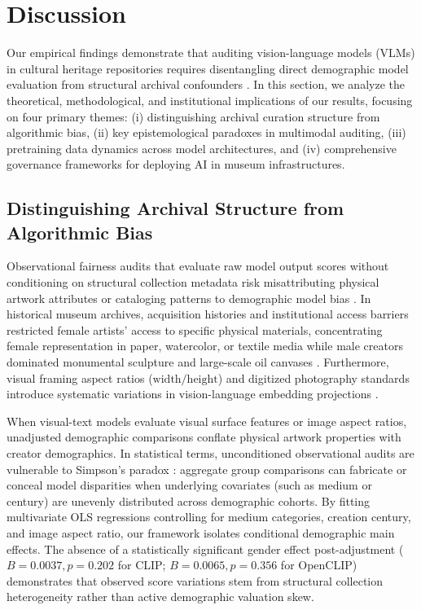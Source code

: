 \documentclass[pdflatex,sn-mathphys-num]{sn-jnl}%
\theoremstyle{thmstyleone}%
\theoremstyle{thmstyletwo}%
\theoremstyle{thmstylethree}%
\begin{document}
\section{Discussion}
\label{sec:discussion}

Our empirical findings demonstrate that auditing vision-language models (VLMs) in cultural heritage repositories requires disentangling direct demographic model evaluation from structural archival confounders \cite{hall2023auditing, noorthuis2020bias, simpson1951interpretation}. In this section, we analyze the theoretical, methodological, and institutional implications of our results, focusing on four primary themes: (i) distinguishing archival curation structure from algorithmic bias, (ii) key epistemological paradoxes in multimodal auditing, (iii) pretraining data dynamics across model architectures, and (iv) comprehensive governance frameworks for deploying AI in museum infrastructures.

\subsection{Distinguishing Archival Structure from Algorithmic Bias}
Observational fairness audits that evaluate raw model output scores without conditioning on structural collection metadata risk misattributing physical artwork attributes or cataloging patterns to demographic model bias \cite{hall2023auditing, buolamwini2018gender}. In historical museum archives, acquisition histories and institutional access barriers restricted female artists' access to specific physical materials, concentrating female representation in paper, watercolor, or textile media while male creators dominated monumental sculpture and large-scale oil canvases \cite{topaz2019diversity, bailey2020gender, nochlin1971why}. Furthermore, visual framing aspect ratios ($\text{width}/\text{height}$) and digitized photography standards introduce systematic variations in vision-language embedding projections \cite{fiorucci2020machine}.

When visual-text models evaluate visual surface features or image aspect ratios, unadjusted demographic comparisons conflate physical artwork properties with creator demographics. In statistical terms, unconditioned observational audits are vulnerable to Simpson's paradox \cite{simpson1951interpretation}: aggregate group comparisons can fabricate or conceal model disparities when underlying covariates (such as medium or century) are unevenly distributed across demographic cohorts. By fitting multivariate OLS regressions controlling for medium categories, creation century, and image aspect ratio, our framework isolates conditional demographic main effects. The absence of a statistically significant gender effect post-adjustment ($B = 0.0037, p = 0.202$ for CLIP; $B = 0.0065, p = 0.356$ for OpenCLIP) demonstrates that observed score variations stem from structural collection heterogeneity rather than active demographic valuation skew.
\end{document}
